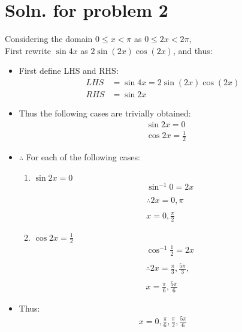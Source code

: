 \documentclass[12pt]{article}
\begin{document}
\newpage
\section*{Soln. for problem 2}

Considering the domain $0 \leq x<\pi$ as $0 \leq 2x<2\pi$, \\
First rewrite $\sin{4x}$ as $2\sin{(2x)}\cos{(2x)}$, and thus:
\begin{itemize}
	\item First define LHS and RHS:
	      \begin{align*}
		      LHS & = \sin{4x}=2\sin{(2x)}\cos{(2x)} \\
		      RHS & =\sin{2x}
	      \end{align*}

	\item Thus the following cases are trivially obtained:
	      \begin{align*}
		       & \sin{2x} = 0           \\
		       & \cos{2x} = \frac{1}{2}
	      \end{align*}

	\item $\therefore$ For each of the following cases:
	      \begin{enumerate}
		      \item $\displaystyle\sin{2x} = 0$
		            \begin{gather*}
			            \sin^{-1}{0} = 2x \\ \\
			            \therefore 2x = 0, \pi \\ \\
			            x = 0, \frac{\pi}{2}
		            \end{gather*}
		      \item $\displaystyle\cos{2x} = \displaystyle\frac{1}{2}$
		            \begin{gather*}
			            \cos^{-1}{\frac{1}{2}} = 2x \\ \\
			            \therefore 2x = \frac{\pi}{3}, \frac{5\pi}{3}, \\ \\
			            x  = \frac{\pi}{6}, \frac{5\pi}{6}
		            \end{gather*}
	      \end{enumerate}

	\item Thus:
	      \begin{gather*}
		      x = 0, \frac{\pi}{6}, \frac{\pi}{2}, \frac{5\pi}{6}
	      \end{gather*}

\end{itemize}
\end{document}
